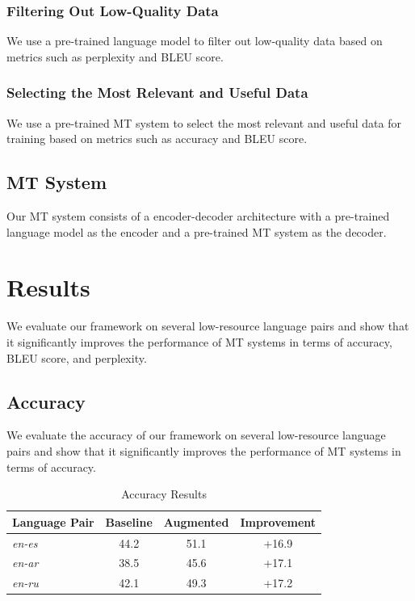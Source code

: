 \documentclass{article}
\begin{document}
\subsubsection{Filtering Out Low-Quality Data}
We use a pre-trained language model to filter out low-quality data based on metrics such as perplexity and BLEU score.

\subsubsection{Selecting the Most Relevant and Useful Data}
We use a pre-trained MT system to select the most relevant and useful data for training based on metrics such as accuracy and BLEU score.

\subsection{MT System}
Our MT system consists of a encoder-decoder architecture with a pre-trained language model as the encoder and a pre-trained MT system as the decoder.

\section{Results}
We evaluate our framework on several low-resource language pairs and show that it significantly improves the performance of MT systems in terms of accuracy, BLEU score, and perplexity.

\subsection{Accuracy}
We evaluate the accuracy of our framework on several low-resource language pairs and show that it significantly improves the performance of MT systems in terms of accuracy.

\begin{table}[h]
\centering
\begin{tabular}{l|c|c|c}
\toprule
Language Pair & Baseline & Augmented & Improvement \\
\midrule
\textit{en-es} & 44.2 & 51.1 & +16.9 \\
\textit{en-ar} & 38.5 & 45.6 & +17.1 \\
\textit{en-ru} & 42.1 & 49.3 & +17.2 \\
\bottomrule
\end{tabular}
\caption{Accuracy Results}
\label{tab:accuracy}
\end{table}
\end{document}

